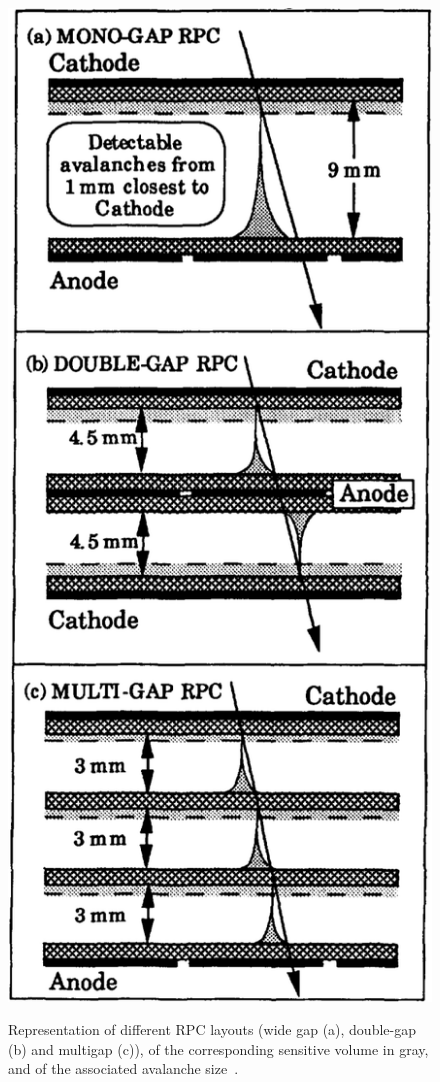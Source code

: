 	\begin{figure}
		\centering
		\includegraphics[width = .8\linewidth]{fig/chapt3/RPC-layouts-dyn-range.png}\\
		\caption{\label{fig:RPClayouts} Representation of different RPC layouts (wide gap (a), double-gap (b) and multigap (c)), of the corresponding sensitive volume in gray, and of the associated avalanche size~\cite{WILLIAMS98}.}
	\end{figure}
	
